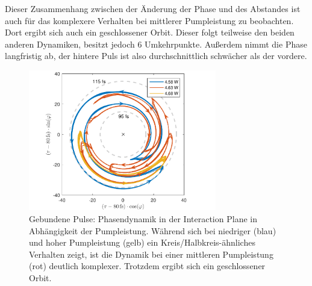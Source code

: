 \documentclass[bachelor,       %
               twoside,        %
               BCOR10mm,       %
               liststotoc,nomtotoc,bibtotoc, %
               english,ngerman, %
               final,          %
               ]{GAUBM}
\begin{document}
Dieser Zusammenhang zwischen der Änderung der Phase und des Abstandes ist auch für das komplexere Verhalten bei mittlerer Pumpleistung zu beobachten.
Dort ergibt sich auch ein geschlossener Orbit.
Dieser folgt teilweise den beiden anderen Dynamiken, besitzt jedoch 6 Umkehrpunkte.
Außerdem nimmt die Phase langfristig ab, der hintere Puls ist also durchschnittlich schwächer als der vordere.
 \begin{figure}[!htb]
	\centering
	\includegraphics[width=0.73\textwidth]{figures/4ms_25GSA_400m_MLrun_runBounceFix_InteractionPlaneArrows_final2.pdf}
	\caption{Gebundene Pulse: Phasendynamik in der Interaction Plane  in Abhängigkeit der Pumpleistung.
	Während sich bei niedriger (blau) und hoher Pumpleistung (gelb) ein Kreis/Halbkreis-ähnliches Verhalten zeigt, ist die Dynamik bei einer mittleren Pumpleistung (rot) deutlich komplexer. Trotzdem ergibt sich ein geschlossener Orbit.}
	\label{fig:interactionPlane}
\end{figure}
\clearpage
\end{document}
